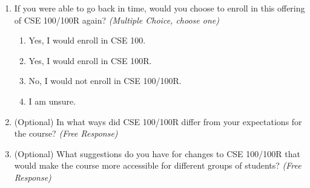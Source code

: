 \begin{enumerate}
    \item If you were able to go back in time, would you choose to enroll in this offering of CSE 100/100R again? \textit{(Multiple Choice, choose one)}
    \begin{enumerate}
        \item Yes, I would enroll in CSE 100.
        \item Yes, I would enroll in CSE 100R.
        \item No, I would not enroll in CSE 100/100R.
        \item I am unsure.
    \end{enumerate}

    \item (Optional) In what ways did CSE 100/100R differ from your expectations for the course? \textit{(Free Response)}

    \item (Optional) What suggestions do you have for changes to CSE 100/100R that would make the course more accessible for different groups of students? \textit{(Free Response)}
\end{enumerate}